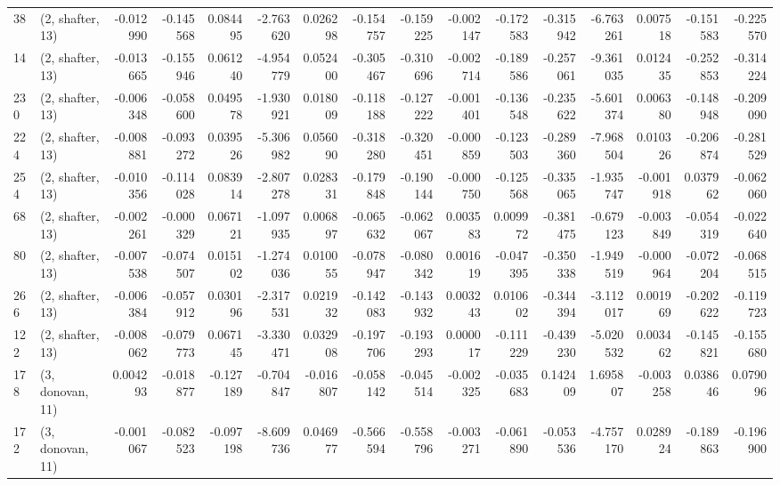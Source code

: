 \begin{tabular}{llrrrrrrrrrrrrrr}
38  &  (2, shafter, 13) &  -0.012990 & -0.145568 &  0.084495 &   -2.763620 &  0.026298 &  -0.154757 & -0.159225 & -0.002147 & -0.172583 & -0.315942 &    -6.763261 &  0.007518 & -0.151583 & -0.225570 \\
14  &  (2, shafter, 13) &  -0.013665 & -0.155946 &  0.061240 &   -4.954779 &  0.052400 &  -0.305467 & -0.310696 & -0.002714 & -0.189586 & -0.257061 &    -9.361035 &  0.012435 & -0.252853 & -0.314224 \\
230 &  (2, shafter, 13) &  -0.006348 & -0.058600 &  0.049578 &   -1.930921 &  0.018009 &  -0.118188 & -0.127222 & -0.001401 & -0.136548 & -0.235622 &    -5.601374 &  0.006380 & -0.148948 & -0.209090 \\
224 &  (2, shafter, 13) &  -0.008881 & -0.093272 &  0.039526 &   -5.306982 &  0.056090 &  -0.318280 & -0.320451 & -0.000859 & -0.123503 & -0.289360 &    -7.968504 &  0.010326 & -0.206874 & -0.281529 \\
254 &  (2, shafter, 13) &  -0.010356 & -0.114028 &  0.083914 &   -2.807278 &  0.028331 &  -0.179848 & -0.190144 & -0.000750 & -0.125568 & -0.335065 &    -1.935747 & -0.001918 &  0.037962 & -0.062060 \\
68  &  (2, shafter, 13) &  -0.002261 & -0.000329 &  0.067121 &   -1.097935 &  0.006897 &  -0.065632 & -0.062067 &  0.003583 &  0.009972 & -0.381475 &    -0.679123 & -0.003849 & -0.054319 & -0.022640 \\
80  &  (2, shafter, 13) &  -0.007538 & -0.074507 &  0.015102 &   -1.274036 &  0.010055 &  -0.078947 & -0.080342 &  0.001619 & -0.047395 & -0.350338 &    -1.949519 & -0.000964 & -0.072204 & -0.068515 \\
266 &  (2, shafter, 13) &  -0.006384 & -0.057912 &  0.030196 &   -2.317531 &  0.021932 &  -0.142083 & -0.143932 &  0.003243 &  0.010602 & -0.344394 &    -3.112017 &  0.001969 & -0.202622 & -0.119723 \\
122 &  (2, shafter, 13) &  -0.008062 & -0.079773 &  0.067145 &   -3.330471 &  0.032908 &  -0.197706 & -0.193293 &  0.000017 & -0.111229 & -0.439230 &    -5.020532 &  0.003462 & -0.145821 & -0.155680 \\
178 &  (3, donovan, 11) &   0.004293 & -0.018877 & -0.127189 &   -0.704847 & -0.016807 &  -0.058142 & -0.045514 & -0.002325 & -0.035683 &  0.142409 &     1.695807 & -0.003258 &  0.038646 &  0.079096 \\
172 &  (3, donovan, 11) &  -0.001067 & -0.082523 & -0.097198 &   -8.609736 &  0.046977 &  -0.566594 & -0.558796 & -0.003271 & -0.061890 & -0.053536 &    -4.757170 &  0.028924 & -0.189863 & -0.196900 \\

\end{tabular}
